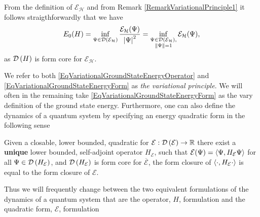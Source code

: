 \begin{remark}\label{RemarkVariationalPrinciple2}
	From the definition of $\mathcal{E_H}$ and from Remark \ref{RemarkVariationalPrinciple1} it follows straigthforwardly that we have \begin{equation}\label{EqVariationalGroundStateEnergyForm}
		E_0(H)=\inf_{\Psi\in \mathcal D\left(\mathcal{E_H}\right)}\frac{\mathcal{E_H}(\Psi)}{\left\lvert \Psi \right\rvert^2}=\inf_{\substack{\Psi\in \mathcal D\left(\mathcal{E_H}\right),\\\left\lVert \Psi \right\rVert=1}}\mathcal{E_H}(\Psi), 
	\end{equation}
	as $ \mathcal D\left(H\right) $ is form core for $\mathcal{E_H}$.
\end{remark}
We refer to both \eqref{EqVariationalGroundStateEnergyOperator} and \eqref{EqVariationalGroundStateEnergyForm} as \emph{the variational principle}.
We will often in the remaining take \eqref{EqVariationalGroundStateEnergyForm} as the vary definition of the ground state energy. Furthermore, one can also define the dynamics of a quantum system by specifying an energy quadratic form in the following sense
\begin{remark}[Ref!!]
	Given a closable, lower bounded, quadratic for $ \mathcal{E}:\mathcal D\left(\mathcal{E}\right)\to \mathbb{R} $ there exist a \textbf{unique} lower bounded, self-adjoint operator $ H_\mathcal{E} $, such that $ \mathcal{E}(\Psi)=\left\langle\Psi,H_\mathcal{E}\Psi\right\rangle $ for all $ \Psi\in \mathcal D\left(H_\mathcal{E}\right) $, and $ \mathcal D\left(H_\mathcal{E}\right) $ is form core for $\overline{\mathcal{E}}$, \ie the form closure of $ \left\langle\cdot,H_\mathcal{E}\cdot\right\rangle $ is equal to the form closure of $\mathcal{E}$. 
\end{remark}
Thus we will frequently change between the two equivalent formulations of the dynamics of a quantum system that are the operator, $ H $, formulation and the quadratic form, $ \mathcal{E} $, formulation
